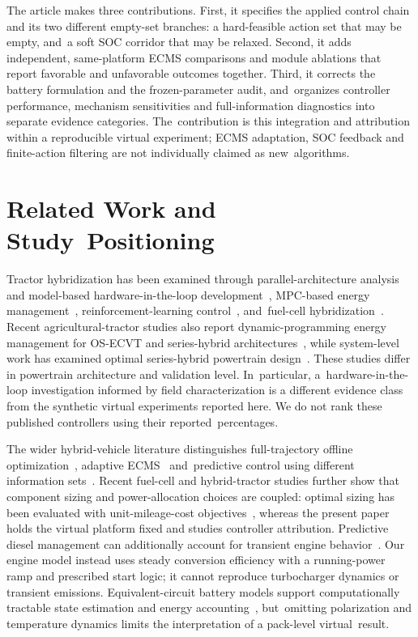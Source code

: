 \documentclass[energies,article,submit,moreauthors]{Definitions/mdpi}
\begin{document}
The article makes three contributions. First, it specifies the applied control chain and its two different empty-set branches: a hard-feasible action set that may be empty, and~a soft SOC corridor that may be relaxed. Second, it adds independent, same-platform ECMS comparisons and module ablations that report favorable and unfavorable outcomes together. Third, it corrects the battery formulation and the frozen-parameter audit, and~organizes controller performance, mechanism sensitivities and full-information diagnostics into separate evidence categories. The~contribution is this integration and attribution within a reproducible virtual experiment; ECMS adaptation, SOC feedback and finite-action filtering are not individually claimed as new~algorithms.

\section{Related Work and Study~Positioning}
Tractor hybridization has been examined through parallel-architecture analysis and model-based hardware-in-the-loop development~\cite{mocera2020,mocera2020b}, MPC-based energy management~\cite{curiel2023}, reinforcement-learning control~\cite{wu2024}, and~fuel-cell hybridization~\cite{zhao2024,zhang2024freq}. Recent agricultural-tractor studies also report dynamic-programming energy management for OS-ECVT and series-hybrid architectures~\cite{zhang2024osecvt,yan2024series}, while system-level work has examined optimal series-hybrid powertrain design~\cite{perez2024}. These studies differ in powertrain architecture and validation level. In~particular, a~hardware-in-the-loop investigation informed by field characterization is a different evidence class from the synthetic virtual experiments reported here. We do not rank these published controllers using their reported~percentages.

The wider hybrid-vehicle literature distinguishes full-trajectory offline optimization~\cite{xie2016}, adaptive ECMS~\cite{musardo2005} and~predictive control using different information sets~\mbox{\cite{ripaccioli2010,zhang2017,wang2016}}. Recent fuel-cell and hybrid-tractor studies further show that component sizing and power-allocation choices are coupled: optimal sizing has been evaluated with unit-mileage-cost objectives~\cite{wang2025sizing}, whereas the present paper holds the virtual platform fixed and studies controller attribution. Predictive diesel management can additionally account for transient engine behavior~\cite{huo2018}. Our engine model instead uses steady conversion efficiency with a running-power ramp and prescribed start logic; it cannot reproduce turbocharger dynamics or transient emissions. Equivalent-circuit battery models support computationally tractable state estimation and energy accounting~\cite{plett2004}, but~omitting polarization and temperature dynamics limits the interpretation of a pack-level virtual~result.
\end{document}
